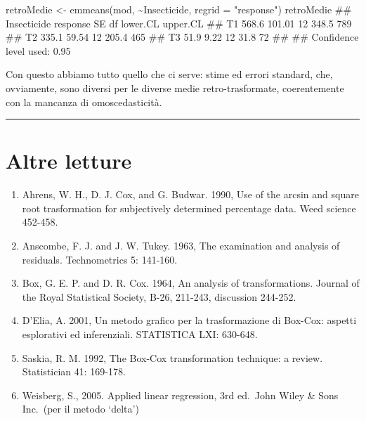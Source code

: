 \documentclass[a4paper,12pt,oneside]{book}
\providecommand{\tightlist}{%
  \setlength{\itemsep}{0pt}\setlength{\parskip}{0pt}}
\newenvironment{Shaded}{\begin{snugshade}}{\end{snugshade}}
\newcommand{\SpecialCharTok}[1]{#1}
\newcommand{\StringTok}[1]{#1}
\newcommand{\DocumentationTok}[1]{#1}
\newcommand{\OtherTok}[1]{#1}
\newcommand{\FunctionTok}[1]{#1}
\newcommand{\AttributeTok}[1]{#1}
\newcommand{\NormalTok}[1]{#1}
\begin{document}
\begin{Shaded}
\begin{Highlighting}[]
\NormalTok{retroMedie }\OtherTok{\textless{}{-}} \FunctionTok{emmeans}\NormalTok{(mod, }\SpecialCharTok{\textasciitilde{}}\NormalTok{Insecticide, }\AttributeTok{regrid =} \StringTok{"response"}\NormalTok{)}
\NormalTok{retroMedie}
\DocumentationTok{\#\#  Insecticide response     SE df lower.CL upper.CL}
\DocumentationTok{\#\#  T1             568.6 101.01 12    348.5      789}
\DocumentationTok{\#\#  T2             335.1  59.54 12    205.4      465}
\DocumentationTok{\#\#  T3              51.9   9.22 12     31.8       72}
\DocumentationTok{\#\# }
\DocumentationTok{\#\# Confidence level used: 0.95}
\end{Highlighting}
\end{Shaded}

Con questo abbiamo tutto quello che ci serve: stime ed errori standard, che, ovviamente, sono diversi per le diverse medie retro-trasformate, coerentemente con la mancanza di omoscedasticità.

\begin{center}\rule{0.5\linewidth}{0.5pt}\end{center}

\hypertarget{altre-letture-7}{%
\section{Altre letture}\label{altre-letture-7}}

\begin{enumerate}
\def\labelenumi{\arabic{enumi}.}
\tightlist
\item
  Ahrens, W. H., D. J. Cox, and G. Budwar. 1990, Use of the arcsin and square root trasformation for subjectively determined percentage data. Weed science 452-458.
\item
  Anscombe, F. J. and J. W. Tukey. 1963, The examination and analysis of residuals. Technometrics 5: 141-160.
\item
  Box, G. E. P. and D. R. Cox. 1964, An analysis of transformations. Journal of the Royal Statistical Society, B-26, 211-243, discussion 244-252.
\item
  D'Elia, A. 2001, Un metodo grafico per la trasformazione di Box-Cox: aspetti esplorativi ed inferenziali. STATISTICA LXI: 630-648.
\item
  Saskia, R. M. 1992, The Box-Cox transformation technique: a review. Statistician 41: 169-178.
\item
  Weisberg, S., 2005. Applied linear regression, 3rd ed.~John Wiley \& Sons Inc.~(per il metodo `delta')
\end{enumerate}
\end{document}
